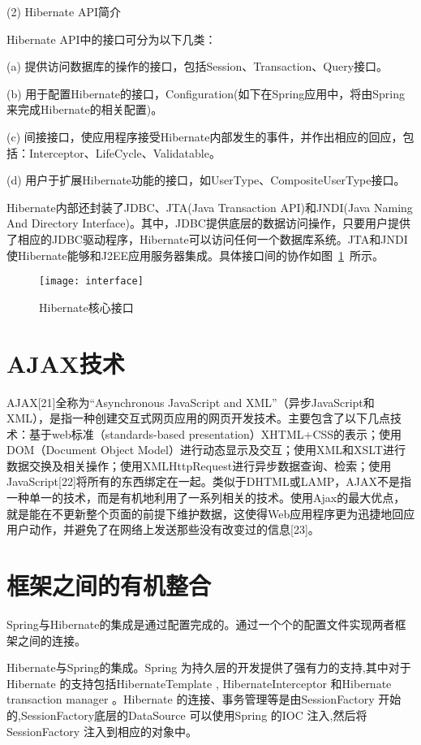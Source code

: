 (2) Hibernate API简介\par
Hibernate API中的接口可分为以下几类：\par
(a)	提供访问数据库的操作的接口，包括Session、Transaction、Query接口。\par
(b)	用于配置Hibernate的接口，Configuration(如下在Spring应用中，将由Spring来完成Hibernate的相关配置)。\par
(c)	间接接口，使应用程序接受Hibernate内部发生的事件，并作出相应的回应，包括：Interceptor、LifeCycle、Validatable。\par
(d)	用户于扩展Hibernate功能的接口，如UserType、CompositeUserType接口。\par
Hibernate内部还封装了JDBC、JTA(Java Transaction API)和JNDI(Java Naming And Directory Interface)。其中，JDBC提供底层的数据访问操作，只要用户提供了相应的JDBC驱动程序，Hibernate可以访问任何一个数据库系统。JTA和JNDI使Hibernate能够和J2EE应用服务器集成。具体接口间的协作如图~\ref{fig:interface}~所示。 
\begin{figure}[htbp]
\centering
\texttt{[image: interface]}
\caption{Hibernate核心接口}\label{fig:interface}
\vspace{\baselineskip}
\end{figure}

\section{AJAX技术}
AJAX[21]全称为“Asynchronous JavaScript and XML”（异步JavaScript和XML），是指一种创建交互式网页应用的网页开发技术。主要包含了以下几点技术：基于web标准（standards-based presentation）XHTML+CSS的表示；使用DOM（Document Object Model）进行动态显示及交互；使用XML和XSLT进行数据交换及相关操作；使用XMLHttpRequest进行异步数据查询、检索；使用JavaScript[22]将所有的东西绑定在一起。类似于DHTML或LAMP，AJAX不是指一种单一的技术，而是有机地利用了一系列相关的技术。使用Ajax的最大优点，就是能在不更新整个页面的前提下维护数据，这使得Web应用程序更为迅捷地回应用户动作，并避免了在网络上发送那些没有改变过的信息[23]。

\section{框架之间的有机整合}
Spring与Hibernate的集成是通过配置完成的。通过一个个的配置文件实现两者框架之间的连接。

Hibernate与Spring的集成。Spring 为持久层的开发提供了强有力的支持,其中对于Hibernate 的支持包括HibernateTemplate , HibernateInterceptor 和Hibernate transaction manager 。Hibernate 的连接、事务管理等是由SessionFactory 开始的,SessionFactory底层的DataSource 可以使用Spring 的IOC 注入,然后将SessionFactory 注入到相应的对象中。
